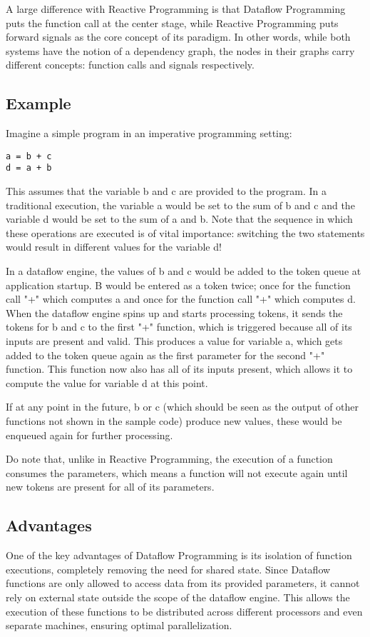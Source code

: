 A large difference with Reactive Programming is that Dataflow Programming puts the function call at the center stage, while Reactive Programming puts forward signals as the core concept of its paradigm. In other words, while both systems have the notion of a dependency graph, the nodes in their graphs carry different concepts: function calls and signals respectively.
 

\subsection{Example}

Imagine a simple program in an imperative programming setting:

\begin{lstlisting}
a = b + c
d = a + b
\end{lstlisting}

This assumes that the variable b and c are provided to the program.
In a traditional execution, the variable a would be set to the sum of b and c and the variable d would be set to the sum of a and b. Note that the sequence in which these operations are executed is of vital importance: switching the two statements would result in different values for the variable d!

In a dataflow engine, the values of b and c would be added to the token queue at application startup. B would be entered as a token twice; once for the function call "+" which computes a and once for the function call "+" which computes d. When the dataflow engine spins up and starts processing tokens, it sends the tokens for b and c to the first "+" function, which is triggered because all of its inputs are present and valid. This produces a value for variable a, which gets added to the token queue again as the first parameter for the second "+" function. This function now also has all of its inputs present, which allows it to compute the value for variable d at this point.

If at any point in the future, b or c (which should be seen as the output of other functions not shown in the sample code) produce new values, these would be enqueued again for further processing.

Do note that, unlike in Reactive Programming, the execution of a function consumes the parameters, which means a function will not execute again until new tokens are present for all of its parameters.

\subsection{Advantages}

One of the key advantages of Dataflow Programming is its isolation of function executions, completely removing the need for shared state. Since Dataflow functions are only allowed to access data from its provided parameters, it cannot rely on external state outside the scope of the dataflow engine. This allows the execution of these functions to be distributed across different processors and even separate machines, ensuring optimal parallelization. 




